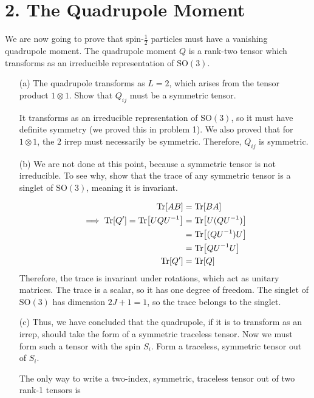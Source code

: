 \documentclass[a4paper,twoside]{article}
\begin{document}
\section*{2. The Quadrupole Moment}
We are now going to prove that spin-$ \frac{1}{2} $ particles must have a vanishing quadrupole moment. The quadrupole moment $ Q $ is a rank-two tensor which transforms as an irreducible representation of $\text{SO}(3)$.
\begin{itemize}
    \item[(a)] The quadrupole transforms as $ L=2 $, which arises from the tensor product $ 1 \otimes 1 $. Show that $ Q_{ij} $ must be a symmetric tensor.
        \begin{problem}
            It transforms as an irreducible representation of $\text{SO}(3)$, so it must have definite symmetry (we proved this in problem 1). We also proved that for $ 1 \otimes 1 $, the $ 2 $ irrep must necessarily be symmetric. Therefore, $ Q_{ij} $ is symmetric.
        \end{problem}
    \item[(b)] We are not done at this point, because a symmetric tensor is not irreducible. To see why, show that the trace of any symmetric tensor is a singlet of $\text{SO}(3)$, meaning it is invariant.
        \begin{problem}
            \begin{align}
                \Tr[AB] &= \Tr[BA] \\
                \implies \Tr[Q'] = \Tr[UQ U^{-1}] &= \Tr[U (QU^{-1})] \\
                &= \Tr[(QU^{-1})U] \\
                &= \Tr[QU^{-1} U] \\
                \Tr[Q'] &= \Tr[Q]
            \end{align}
            Therefore, the trace is invariant under rotations, which act as unitary matrices. The trace is a scalar, so it has one degree of freedom. The singlet of $\text{SO}(3)$ has dimension $ 2J+1 = 1 $, so the trace belongs to the singlet.
        \end{problem}
    \item[(c)] Thus, we have concluded that the quadrupole, if it is to transform as an irrep, should take the form of a symmetric traceless tensor. Now we must form such a tensor with the spin $ S_i $. Form a traceless, symmetric tensor out of $ S_i $.
        \begin{problem}
            The only way to write a two-index, symmetric, traceless tensor out of two rank-1 tensors is

\end{problem}
\end{itemize}
\end{document}
